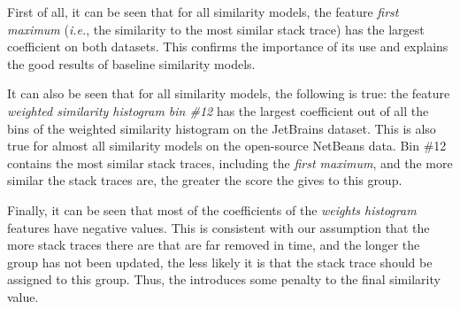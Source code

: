 First of all, it can be seen that for all similarity models, the feature \textit{first maximum} (\textit{i.e.}, the similarity to the most similar stack trace) has the largest coefficient on both datasets. This confirms the importance of its use and explains the good results of baseline similarity models.

It can also be seen that for all similarity models, the following is true: the feature \textit{weighted similarity histogram bin \#12} has the largest coefficient out of all the bins of the weighted similarity histogram on the JetBrains dataset.
This is also true for almost all similarity models on the open-source NetBeans data.
Bin \#12 contains the most similar stack traces, including the \textit{first maximum}, and the more similar the stack traces are, the greater the score the \ag gives to this group.

Finally, it can be seen that most of the coefficients of the \textit{weights histogram} features have negative values. 
This is consistent with our assumption that the more stack traces there are that are far removed in time, and the longer the group has not been updated, the less likely it is that the stack trace should be assigned to this group. 
Thus, the \ag introduces some penalty to the final similarity value.

\vspace{0.1cm}


\vspace{0.1cm}